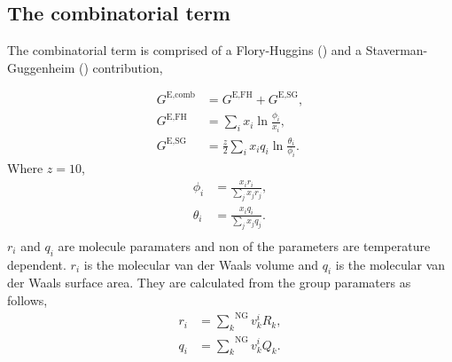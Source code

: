 \documentclass[english]{../thermomemo/thermomemo}
\newcommand*{\ousum}[2]{\overset{#1}{\underset{#2}{\sum}}}
\newcommand{\excess}{\text{E}\xspace}
\newcommand{\comb}{\text{comb}\xspace}
\newcommand{\FH}{\text{FH}\xspace}
\newcommand{\SG}{\text{SG}\xspace}
\newcommand{\NGr}{\text{NG}\xspace}
\begin{document}
\subsection{The combinatorial term}
The combinatorial term is comprised of a Flory-Huggins (\FH) and a
Staverman-Guggenheim (\SG) contribution,

\begin{align}
  G^{\excess,\comb} &= G^{\excess,\FH} + G^{\excess,\SG},\label{eq:comb}\\
  G^{\excess,\FH} &= \underset{i}{\sum} x_i \ln \frac{\phi_i}{x_i}, \label{eq:fh}\\
  G^{\excess,\SG} &= \frac{z}{2} \underset{i}{\sum} x_i q_i \ln \frac{\theta_i}{\phi_i}\label{eq:sg}.
\end{align}
Where $z=10$,
\begin{align}
  \phi_i &= \frac{x_i r_i}{\underset{j}{\sum} x_j r_j},\label{eq:phii}\\
  \theta_i &= \frac{x_i q_i}{\underset{j}{\sum} x_j q_j}.\label{eq:thetai}\\
\end{align}
$r_i$ and $q_i$ are molecule paramaters and non of the parameters are temperature dependent. $r_i$ is the molecular van der Waals volume and $q_i$ is the molecular van der Waals surface area. They are calculated from the group paramaters as follows,
\begin{align}
  r_i &= \ousum{\NGr}{k}v_k^i R_k,\label{eq:ri}\\
  q_i &= \ousum{\NGr}{k}v_k^i Q_k.\label{eq:qi}\\
\end{align}
\end{document}
